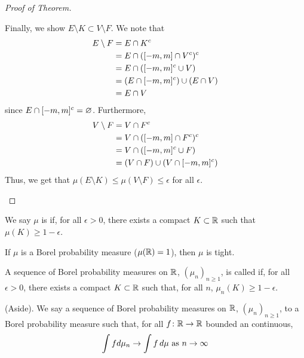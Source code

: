 \documentclass[11pt,leqno,oneside]{amsbook}
\numberwithin{thm}{section}
\renewcommand{\emptyset}{\varnothing}
\begin{document}
\begin{proof}[Proof of Theorem]
\begin{itemize}
      Finally, we show $E \setminus K \subset V \setminus F$. We note
      that
      \begin{align*}
        E \setminus F & = E \cap K^c \\
                      & = E \cap ([-m,m] \cap V^c)^c \\
                      & = E \cap ([-m,m]^c \cup V) \\
                      & = (E \cap [-m,m]^c) \cup (E \cap
                        V)\\
                      & = E \cap V
      \end{align*}
      since $E \intersect [-m,m]^c = \emptyset$. Furthermore,
      \begin{align*}
        V \setminus F & = V \cap F^c \\
                      & = V \cap ([-m,m] \cap F^c)^c \\
                      & = V \cap ([-m,m]^c \cup F) \\
        & = (V \cap F) \cup (V \cap [-m,m]^c)
      \end{align*}
      Thus, we get that $\mu(E \setminus K) \leq \mu(V \setminus F)
      \leq \epsilon$ for all $\epsilon$.
    \end{itemize}
  \end{proof}
  \begin{defn}
    We say $\mu$ is  if, for all $\epsilon > 0$, there
    exists a compact $K \subset {\mathbb R}$ such that $\mu(K) \geq
    1-\epsilon$.
  \end{defn}
  \begin{cor}
    If $\mu$ is a Borel probability measure ($\mu({\mathbb R}) = 1$), then
    $\mu$ is tight.
  \end{cor}
  \begin{defn}
    A sequence of Borel probability measures on ${\mathbb R}$, $(\mu_n)_{n \geq
    1}$, is called  if, for all $\epsilon > 0$,
  there exists a compact $K \subset {\mathbb R}$ such that, for all $n$,
  $\mu_n(K) \geq 1 - \epsilon$.
  \end{defn}
  \begin{defn}
    (Aside). We say a sequence of Borel probability measures on ${\mathbb R}$,
    $(\mu_n)_{n \geq 1}$,  to a Borel probability
    measure such that, for all $f \colon {\mathbb R} \to {\mathbb R}$ bounded an
    continuous, \[
      \int f d \mu_n \to \int f \, d\mu \text{ as } n \to \infty
    \]
  \end{defn}
\end{document}
